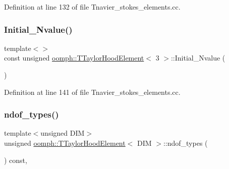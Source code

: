 Definition at line 132 of file Tnavier\+\_\+stokes\+\_\+elements.\+cc.

\mbox{\label{classoomph_1_1TTaylorHoodElement_ae560bd9e8c6c135e9d6218c959ea4533}} 
\subsubsection{\texorpdfstring{Initial\+\_\+\+Nvalue()}{Initial\_Nvalue()}\hspace{0.1cm}{\footnotesize\ttfamily [2/2]}}
{\footnotesize\ttfamily template$<$$>$ \\
const unsigned \hyperlink{classoomph_1_1TTaylorHoodElement}{oomph\+::\+T\+Taylor\+Hood\+Element}$<$ 3 $>$\+::Initial\+\_\+\+Nvalue (\begin{DoxyParamCaption}{ }\end{DoxyParamCaption})\hspace{0.3cm}{\ttfamily [private]}}



Definition at line 141 of file Tnavier\+\_\+stokes\+\_\+elements.\+cc.

\mbox{\label{classoomph_1_1TTaylorHoodElement_ab4b5b18fb755a690e296b2ed00b32647}} 
\subsubsection{\texorpdfstring{ndof\+\_\+types()}{ndof\_types()}}
{\footnotesize\ttfamily template$<$unsigned D\+IM$>$ \\
unsigned \hyperlink{classoomph_1_1TTaylorHoodElement}{oomph\+::\+T\+Taylor\+Hood\+Element}$<$ D\+IM $>$\+::ndof\+\_\+types (\begin{DoxyParamCaption}{ }\end{DoxyParamCaption}) const\hspace{0.3cm}{\ttfamily [inline]}, {\ttfamily [virtual]}}



